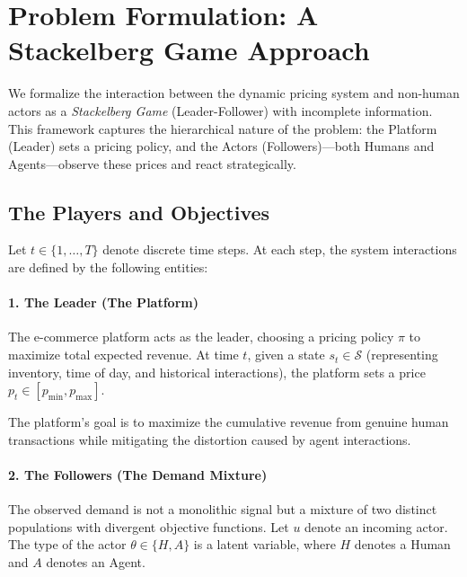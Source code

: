 
\section{Problem Formulation: A Stackelberg Game Approach}
\label{sec:math_formulation}

We formalize the interaction between the dynamic pricing system and non-human actors as a \textit{Stackelberg Game} (Leader-Follower) with incomplete information. This framework captures the hierarchical nature of the problem: the Platform (Leader) sets a pricing policy, and the Actors (Followers)---both Humans and Agents---observe these prices and react strategically.

\subsection{The Players and Objectives}

Let $t \in \{1, \dots, T\}$ denote discrete time steps. At each step, the system interactions are defined by the following entities:

\paragraph{1. The Leader (The Platform)}
The e-commerce platform acts as the leader, choosing a pricing policy $\pi$ to maximize total expected revenue. At time $t$, given a state $s_t \in \mathcal{S}$ (representing inventory, time of day, and historical interactions), the platform sets a price $p_t \in [p_{\min}, p_{\max}]$.

The platform's goal is to maximize the cumulative revenue from genuine human transactions while mitigating the distortion caused by agent interactions.

\paragraph{2. The Followers (The Demand Mixture)}
The observed demand is not a monolithic signal but a mixture of two distinct populations with divergent objective functions. Let $u$ denote an incoming actor. The type of the actor $\theta \in \{H, A\}$ is a latent variable, where $H$ denotes a Human and $A$ denotes an Agent.

